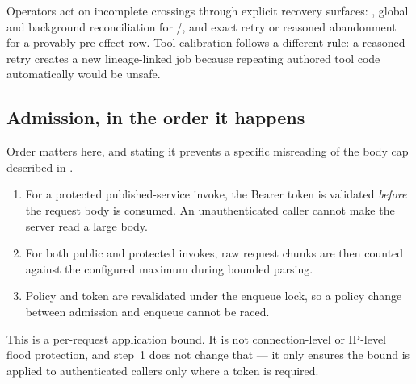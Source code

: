 Operators act on incomplete crossings through explicit recovery surfaces:
, global and background reconciliation for
/, and exact retry or reasoned abandonment
for a provably pre-effect  row. Tool calibration follows a different
rule: a reasoned retry creates a new lineage-linked job because repeating authored
tool code automatically would be unsafe.

\subsection{Admission, in the order it happens}

Order matters here, and stating it prevents a specific misreading of the body cap
described in .

\begin{enumerate}[leftmargin=1.5em]
\item For a protected published-service invoke, the Bearer token is validated
      \emph{before} the request body is consumed. An unauthenticated caller cannot
      make the server read a large body.
\item For both public and protected invokes, raw request chunks are then counted
      against the configured maximum during bounded parsing.
\item Policy and token are revalidated under the enqueue lock, so a policy change
      between admission and enqueue cannot be raced.
\end{enumerate}

This is a per-request application bound. It is not connection-level or IP-level
flood protection, and step~1 does not change that --- it only ensures the bound is
applied to authenticated callers only where a token is required.
